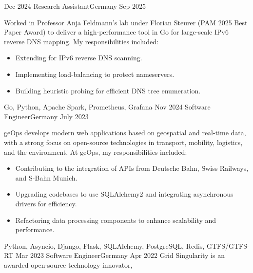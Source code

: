 %
%
%

\begin{experiences}
  \experience
    {Dec 2024} {Research Assistant}{}{Germany}
    {Sep 2025} {
        Worked in Professor Anja Feldmann’s lab under Florian Steurer (PAM 2025 Best Paper Award)
        to deliver a high-performance tool in Go for large-scale IPv6 reverse DNS mapping.
        My responsibilities included:
        \begin{itemize}
            \item Extending {} for IPv6 reverse DNS scanning.
            \item Implementing load-balancing to protect nameservers.
            \item Building heuristic probing for efficient DNS tree enumeration.
        \end{itemize}
    }
    {Go, Python, Apache Spark, Prometheus, Grafana}
  \emptySeparator
  \experience
    {Nov 2024} {Software Engineer}{}{Germany}
    {July 2023} {
      geOps develops modern web applications based on geospatial and real-time data,
      with a strong focus on open-source technologies in transport, mobility, logistics,
      and the environment. At geOps, my responsibilities included:
      \begin{itemize}
        \item Contributing to the integration of APIs from Deutsche Bahn, Swiss Railways, and S-Bahn Munich.
        \item Upgrading codebases to use SQLAlchemy2 and integrating asynchronous drivers for efficiency.
        \item Refactoring data processing components to enhance scalability and performance.
      \end{itemize}
    }
    {Python, Asyncio, Django, Flask, SQLAlchemy, PostgreSQL, Redis, GTFS/GTFS-RT}
  \emptySeparator
  \experience
  {Mar 2023} {Software Engineer}{}{Germany}
  {Apr 2022} {
    Grid Singularity is an awarded open-source technology innovator,
}
\end{experiences}
